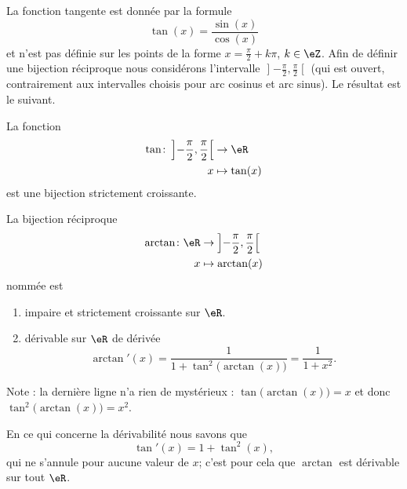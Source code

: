 La fonction tangente est donnée par la formule
\begin{equation}
    \tan(x)=\frac{ \sin(x) }{ \cos(x) }
\end{equation}
et n'est pas définie sur les points de la forme \( x=\frac{ \pi }{2}+k\pi\), \( k\in \eZ\). Afin de définir une bijection réciproque nous considérons l'intervalle \( \mathopen] -\frac{ \pi }{2} , \frac{ \pi }{2} \mathclose[\) (qui est ouvert, contrairement aux intervalles choisis pour arc cosinus et arc sinus). Le résultat est le suivant.

\begin{theorem}
    La fonction
    \begin{equation}
        \begin{aligned}
        \tan\colon \left] -\frac{ \pi }{2} , \frac{ \pi }{2} \right[&\to \eR \\
            x&\mapsto \tan(x) 
        \end{aligned}
    \end{equation}
    est une bijection strictement croissante.

    La bijection réciproque 
    \begin{equation}
        \begin{aligned}
        \arctan\colon \eR&\to \left] -\frac{ \pi }{2} , \frac{ \pi }{2} \right[ \\
            x&\mapsto \arctan(x) 
        \end{aligned}
    \end{equation}
    nommée  est
    \begin{enumerate}
        \item
            impaire et strictement croissante sur \( \eR\).
        \item
            dérivable sur \( \eR\) de dérivée
            \begin{equation}
                \arctan'(x)=\frac{1}{ 1+\tan^2\big( \arctan(x) \big) }=\frac{1}{ 1+x^2 }.
            \end{equation}
    \end{enumerate}
\end{theorem}
Note : la dernière ligne n'a rien de mystérieux : \( \tan\big( \arctan(x) \big)=x\) et donc \( \tan^2\big( \arctan(x) \big)=x^2\).    

En ce qui concerne la dérivabilité nous savons que
\begin{equation}
    \tan'(x)=1+\tan^2(x) ,
\end{equation}
qui ne s'annule pour aucune valeur de \( x\); c'est pour cela que \( \arctan\) est dérivable sur tout \( \eR\).

